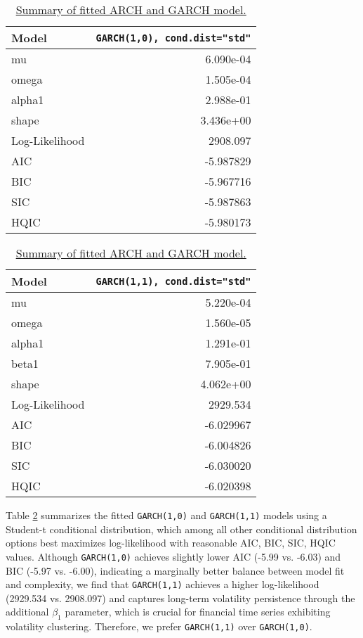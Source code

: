\documentclass{article}
\newcommand{\1}{\mathbbm{1}}
\theoremstyle{definition}
\begin{document}
\begin{table}[H]
\centering
\begin{minipage}[t]{0.48\textwidth} %
\centering
\scriptsize %
\begin{tabular}{l|r}
\hline
\textbf{Model}  & \texttt{GARCH(1,0), cond.dist="std"} \\
\hline
mu & 6.090e-04\\
omega & 1.505e-04\\
alpha1 & 2.988e-01\\
shape & 3.436e+00\\
\hline
Log-Likelihood  & 2908.097 \\
AIC             & -5.987829 \\
BIC             & -5.967716 \\
SIC             & -5.987863\\
HQIC            & -5.980173\\
\hline
\end{tabular}
\end{minipage}
\hfill
\begin{minipage}[t]{0.48\textwidth} %
\centering
\scriptsize %
\begin{tabular}{l|r}
\hline
\textbf{Model}  & \texttt{GARCH(1,1), cond.dist="std"} \\
\hline
mu              & 5.220e-04\\
omega           & 1.560e-05\\
alpha1          & 1.291e-01\\
beta1           & 7.905e-01\\
shape           & 4.062e+00\\
\hline
Log-Likelihood  & 2929.534 \\
AIC             & -6.029967 \\
BIC             & -6.004826 \\
SIC             & -6.030020\\
HQIC            & -6.020398\\
\hline
\end{tabular}
\end{minipage}
\caption{\small{\href{https://github.com/Stochastic1017/Walmart-Stock-Forecasting/blob/main/R/Fit_ARCH_GARCH.R}{Summary of fitted ARCH and GARCH model.}}}
\label{tab:arch_garch_model_summary}
\end{table}

Table \ref{tab:arch_garch_model_summary} summarizes the fitted \texttt{GARCH(1,0)} and \texttt{GARCH(1,1)} models using a Student-t conditional distribution, which among all other conditional distribution options best maximizes log-likelihood with reasonable AIC, BIC, SIC, HQIC values. Although \texttt{GARCH(1,0)} achieves slightly lower AIC (-5.99 vs. -6.03) and BIC (-5.97 vs. -6.00), indicating a marginally better balance between model fit and complexity, we find that \texttt{GARCH(1,1)} achieves a higher log-likelihood (2929.534 vs. 2908.097) and captures long-term volatility persistence through the additional $\beta_1$ parameter, which is crucial for financial time series exhibiting volatility clustering. Therefore, we prefer \texttt{GARCH(1,1)} over \texttt{GARCH(1,0)}.
\end{document}
